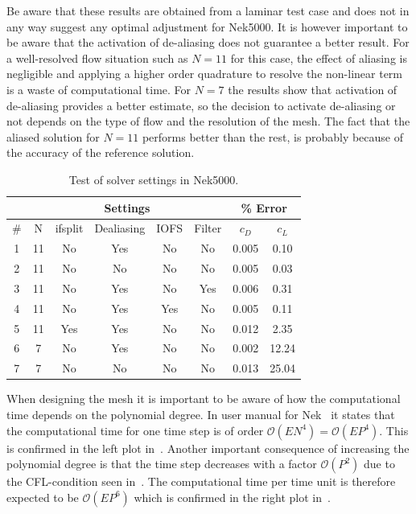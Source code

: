 Be aware that these results are obtained from a laminar test case and does not in any way 
suggest any optimal adjustment for Nek5000. It is however important to be aware that the activation 
of de-aliasing does not guarantee a better result. For a well-resolved flow situation such as $N=11$ 
for this case, the effect of aliasing is negligible and applying a higher order quadrature to resolve the 
non-linear term is a waste of computational time. For $N=7$ the results show that activation of de-aliasing
provides a better estimate, so the decision to activate de-aliasing or not depends on the type of flow
and the resolution of the mesh. The fact that the aliased solution for $N=11$ performs better than the rest, 
is probably because of the accuracy of the reference solution.
%
\begin{table}[h]
    \centering
    \begin{tabular}{c | c c c c c | c c }
         & \multicolumn{5}{|c|}{Settings} & \multicolumn{2}{|c}{\% Error} \\\hline
         \# & N & ifsplit & Dealiasing & IOFS & Filter & $c_D$ & $c_L$ \\  \hline 
         1 &11& No & Yes& No & No & 0.005 & 0.10\\
         2 &11& No & No & No & No & 0.005 & 0.03\\
         3 &11& No & Yes& No & Yes& 0.006 & 0.31\\
         4 &11& No & Yes& Yes& No & 0.005 & 0.11\\
         5 &11& Yes& Yes& No & No & 0.012 & 2.35\\
         6 &7 & No & Yes& No & No & 0.002 & 12.24\\
         7 &7 & No & No & No & No & 0.013 & 25.04\\

    \end{tabular}
    \caption{Test of solver settings in Nek5000.}
    \label{tab:perf}
\end{table}
%

When designing the mesh it is important to be aware of how the computational time depends on the polynomial 
degree. In user manual for Nek~\cite{Nek} it states that the computational time for one time step is 
of order $\mathcal{O}(EN^4) = \mathcal{O}(EP^4)$. This is confirmed in the left plot in~.
Another important consequence of increasing the polynomial degree is that the time step decreases with a factor
$\mathcal{O}(P^2)$ due to the CFL-condition seen in~. The computational time per 
time unit is therefore expected to be $\mathcal{O}(EP^{6})$ which is confirmed in the right plot in~.

